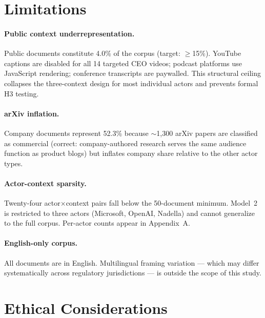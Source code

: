 \documentclass[11pt,a4paper,twocolumn]{article}
\begin{document}
\section*{Limitations}

\paragraph{Public context underrepresentation.}
Public documents constitute 4.0\% of the corpus (target: $\geq$15\%). YouTube
captions are disabled for all 14 targeted CEO videos; podcast platforms use
JavaScript rendering; conference transcripts are paywalled. This structural
ceiling collapses the three-context design for most individual actors and
prevents formal H3 testing.

\paragraph{arXiv inflation.}
Company documents represent 52.3\% because $\sim$1{,}300 arXiv papers are
classified as commercial (correct: company-authored research serves the same
audience function as product blogs) but inflates company share relative to
the other actor types.

\paragraph{Actor-context sparsity.}
Twenty-four actor$\times$context pairs fall below the 50-document minimum. Model~2
is restricted to three actors (Microsoft, OpenAI, Nadella) and cannot
generalize to the full corpus. Per-actor counts appear in Appendix~A.

\paragraph{English-only corpus.}
All documents are in English. Multilingual framing variation — which may differ
systematically across regulatory jurisdictions — is outside the scope of this study.


\section*{Ethical Considerations}
\end{document}
